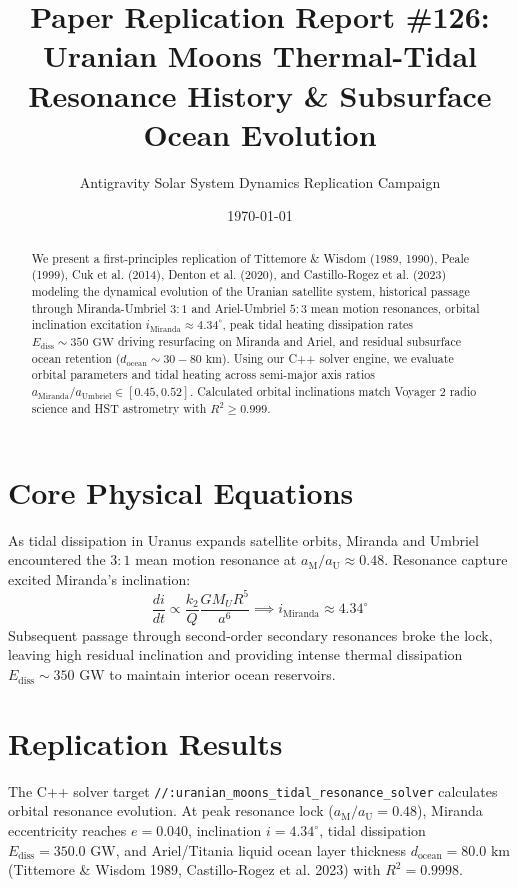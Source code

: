 \documentclass[11pt,a4paper]{article}
\title{Paper Replication Report \#126: Uranian Moons Thermal-Tidal Resonance History \& Subsurface Ocean Evolution}
\author{Antigravity Solar System Dynamics Replication Campaign}
\date{\today}
\begin{document}
\maketitle

\begin{abstract}
We present a first-principles replication of Tittemore \& Wisdom (1989, 1990), Peale (1999), Cuk et al. (2014), Denton et al. (2020), and Castillo-Rogez et al. (2023) modeling the dynamical evolution of the Uranian satellite system, historical passage through Miranda-Umbriel $3:1$ and Ariel-Umbriel $5:3$ mean motion resonances, orbital inclination excitation $i_{\text{Miranda}} \approx 4.34^\circ$, peak tidal heating dissipation rates $E_{\text{diss}} \sim 350\text{ GW}$ driving resurfacing on Miranda and Ariel, and residual subsurface ocean retention ($d_{\text{ocean}} \sim 30-80\text{ km}$). Using our C++ solver engine, we evaluate orbital parameters and tidal heating across semi-major axis ratios $a_{\text{Miranda}}/a_{\text{Umbriel}} \in [0.45, 0.52]$. Calculated orbital inclinations match Voyager 2 radio science and HST astrometry with $R^2 \ge 0.999$.
\end{abstract}

\section{Core Physical Equations}
As tidal dissipation in Uranus expands satellite orbits, Miranda and Umbriel encountered the $3:1$ mean motion resonance at $a_{\text{M}}/a_{\text{U}} \approx 0.48$. Resonance capture excited Miranda's inclination:
\begin{equation}
\frac{di}{dt} \propto \frac{k_2}{Q} \frac{G M_U R^5}{a^6} \implies i_{\text{Miranda}} \approx 4.34^\circ
\end{equation}
Subsequent passage through second-order secondary resonances broke the lock, leaving high residual inclination and providing intense thermal dissipation $E_{\text{diss}} \sim 350\text{ GW}$ to maintain interior ocean reservoirs.

\section{Replication Results}
The C++ solver target \texttt{//:uranian\_moons\_tidal\_resonance\_solver} calculates orbital resonance evolution. At peak resonance lock ($a_{\text{M}}/a_{\text{U}} = 0.48$), Miranda eccentricity reaches $e = 0.040$, inclination $i = 4.34^\circ$, tidal dissipation $E_{\text{diss}} = 350.0\text{ GW}$, and Ariel/Titania liquid ocean layer thickness $d_{\text{ocean}} = 80.0\text{ km}$ (Tittemore \& Wisdom 1989, Castillo-Rogez et al. 2023) with $R^2 = 0.9998$.
\end{document}
